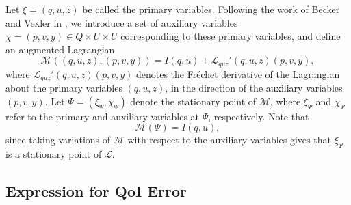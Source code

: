 Let $\xi=(q,u,z)$ be called the primary variables. Following the work of Becker and Vexler in \cite{BecVex05}, we introduce a set of auxiliary variables $\chi=(p,v,y)\in Q\times U\times U$ corresponding to these primary variables, and define an augmented Lagrangian
\begin{equation}
\mathcal{M}((q,u,z),(p,v,y)) = I(q,u) + \mathcal{L}_{quz}'(q,u,z)(p,v,y),
\end{equation}
where $\mathcal{L}_{quz}'(q,u,z)(p,v,y)$ denotes the Fr\'{e}chet derivative of the Lagrangian about the primary variables $(q,u,z)$, in the direction of the auxiliary variables $(p,v,y)$. Let $\Psi = (\xi_\Psi,\chi_\Psi)$ denote the stationary point of $\mathcal{M}$, where $\xi_\Psi$ and $\chi_\Psi$ refer to the primary and auxiliary variables at $\Psi$, respectively. Note that
\begin{equation}
\mathcal{M}(\Psi)=I(q,u),
\label{eq:MeqI}
\end{equation} since taking variations of $\mathcal{M}$ with respect to the auxiliary variables gives that $\xi_\Psi$ is a stationary point of $\mathcal{L}$.

\subsection{Expression for QoI Error} \label{sec:btwnMandadj}

